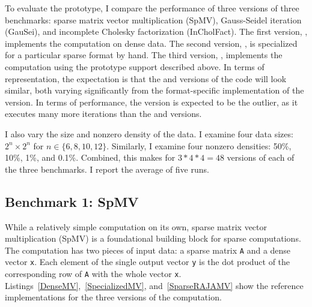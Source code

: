 To evaluate the prototype, I compare the performance of three versions of three benchmarks: sparse matrix vector multiplication (SpMV), Gauss-Seidel iteration (GauSei), and incomplete Cholesky factorization (InCholFact).
The first version, \dense, implements the computation on dense data. 
The second version, \specialized, is specialized for a particular sparse format by hand. 
The third version, \sparseraja, implements the computation using the prototype support described above.
In terms of representation, the expectation is that the \dense{} and \sparseraja{} versions of the code will look similar, both varying significantly from the format-specific implementation of the \specialized{} version.
In terms of performance, the \dense{} version is expected to be the outlier, as it executes many more iterations than the \sparseraja{} and \specialized{} versions.



I also vary the size and nonzero density of the data.
I examine four data sizes: $2^n\times2^n$ for $n\in\{6,8,10,12\}$.
Similarly, I examine four nonzero densities: 50\%, 10\%, 1\%, and 0.1\%. 
Combined, this makes for $3*4*4=48$ versions of each of the three benchmarks.
I report the average of five runs.



\subsection{Benchmark 1: SpMV}
While a relatively simple computation on its own, sparse matrix vector multiplication (SpMV) is a foundational building block for sparse computations.
The computation has two pieces of input data: a sparse matrix \verb.A. and a dense vector \verb.x.. 
Each element of the single output vector \verb.y. is the dot product of the corresponding row of \verb.A. with the whole vector \verb.x..
Listings~\ref{DenseMV},~\ref{SpecializedMV}, and~\ref{SparseRAJAMV} show the reference implementations for the three versions of the computation.


